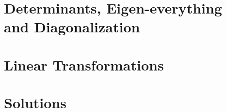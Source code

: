 \documentclass[11pt]{book} %
\begin{document}
\part{Determinants, Eigen-everything  and Diagonalization}











\renewcommand{\partintrotext}{In mathematics, one might begin by studying the objects under consideration --- in this case, vector spaces --- but then equally important is to understand the maps between them, that is, the maps that are ``compatible'' with the vector space structure.  These maps are called \stress{linear transformations}.  We have seen and used several already: the coordinate map, the projection map.}

\part{Linear Transformations}
%





\renewcommand{\partintrotext}{Try every question \stress{before} looking at the solution --- once you've seen a solution, you'll need a fresh new problem to learn from.}
\part{Solutions}



\end{document}
